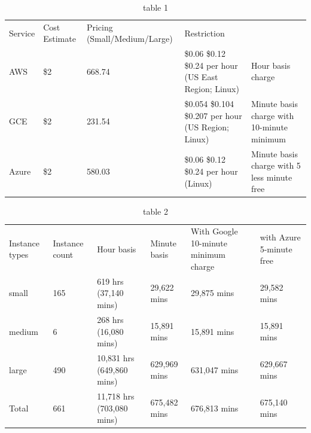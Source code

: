 \documentclass{sig-alternate}
\begin{document}
\begin{table}[htb]
\caption{table 1}\label{T:tab1}
\begin{tabular}{lllll}
Service & Cost Estimate & Pricing (Small/Medium/Large) & Restriction \\
AWS & \$2 & 668.74  & \$0.06 \$0.12 \$0.24 per hour (US East Region; Linux) & Hour basis charge\\
GCE & \$2 & 231.54  & \$0.054 \$0.104 \$0.207 per hour (US Region; Linux) & Minute basis charge with 10-minute minimum\\
Azure & \$2 & 580.03  & \$0.06 \$0.12 \$0.24 per hour (Linux) & Minute basis charge with 5 less minute free\\
\end{tabular}
\end{table}

\begin{table}[htb]
\caption{table 2}\label{T:tab2}
\begin{tabular}{llllll}
Instance types & Instance count & Hour basis & Minute basis & With Google 10-minute minimum charge & with Azure 5-minute free \\
small & 165 & 619 hrs (37,140 mins) & 29,622 mins & 29,875 mins &29,582 mins \\
medium & 6 & 268 hrs (16,080 mins) & 15,891 mins & 15,891 mins & 15,891 mins\\
large & 490 & 10,831 hrs (649,860 mins) & 629,969 mins & 631,047 mins & 629,667 mins\\
Total & 661 & 11,718 hrs (703,080 mins) & 675,482 mins & 676,813 mins & 675,140 mins\\
\end{tabular}
\end{table}
\end{document}
